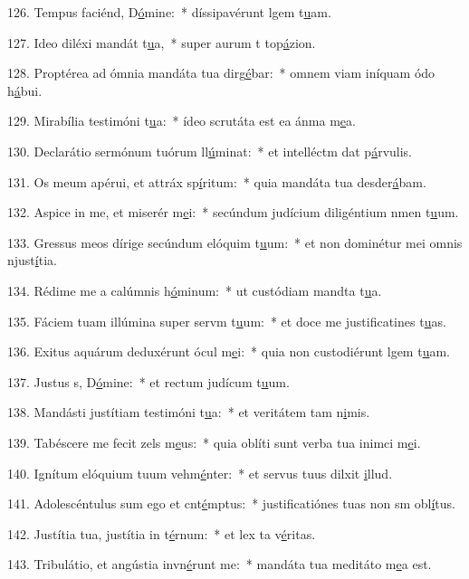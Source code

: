 126. Tempus faciénd, D\uline{ó}mine:~* díssipavérunt lgem t\uline{u}am.\par 
127. Ideo diléxi mandát t\uline{u}a,~* super aurum t top\uline{á}zion.\par 
128. Proptérea ad ómnia mandáta tua dirg\uline{é}bar:~* omnem viam iníquam ódo h\uline{á}bui.\par 
129. Mirabília testimóni t\uline{u}a:~* ídeo scrutáta est ea ánma m\uline{e}a.\par 
130. Declarátio sermónum tuórum ll\uline{ú}minat:~* et intelléctm dat p\uline{á}rvulis.\par 
131. Os meum apérui, et attráx sp\uline{í}ritum:~* quia mandáta tua desder\uline{á}bam.\par 
132. Aspice in me, et miserér m\uline{e}i:~* secúndum judícium diligéntium nmen t\uline{u}um.\par 
133. Gressus meos dírige secúndum elóquim t\uline{u}um:~* et non dominétur mei omnis njust\uline{í}tia.\par 
134. Rédime me a calúmnis h\uline{ó}minum:~* ut custódiam mandta t\uline{u}a.\par 
135. Fáciem tuam illúmina super servm t\uline{u}um:~* et doce me justificatines t\uline{u}as.\par 
136. Exitus aquárum deduxérunt ócul m\uline{e}i:~* quia non custodiérunt lgem t\uline{u}am.\par 
137. Justus s, D\uline{ó}mine:~* et rectum judícum t\uline{u}um.\par 
138. Mandásti justítiam testimóni t\uline{u}a:~* et veritátem tam n\uline{i}mis.\par 
139. Tabéscere me fecit zels m\uline{e}us:~* quia oblíti sunt verba tua inimci m\uline{e}i.\par 
140. Ignítum elóquium tuum vehm\uline{é}nter:~* et servus tuus dilxit \uline{i}llud.\par 
141. Adolescéntulus sum ego et cnt\uline{é}mptus:~* justificatiónes tuas non sm obl\uline{í}tus.\par 
142. Justítia tua, justítia in t\uline{é}rnum:~* et lex ta v\uline{é}ritas.\par 
143. Tribulátio, et angústia invn\uline{é}runt me:~* mandáta tua meditáto m\uline{e}a est.\par 
